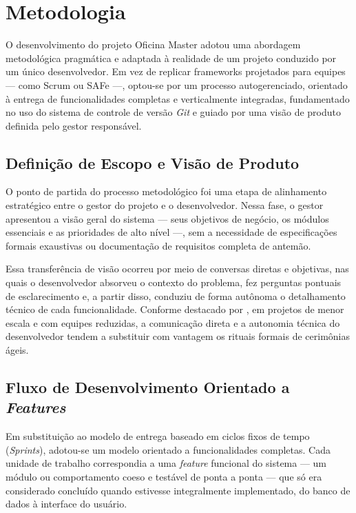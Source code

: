 
\chapter{Metodologia}
\label{cap:metodologia}

O desenvolvimento do projeto Oficina Master adotou uma abordagem metodológica pragmática e adaptada à realidade de um projeto conduzido por um único desenvolvedor. Em vez de replicar frameworks projetados para equipes — como Scrum ou SAFe —, optou-se por um processo autogerenciado, orientado à entrega de funcionalidades completas e verticalmente integradas, fundamentado no uso do sistema de controle de versão \textit{Git} e guiado por uma visão de produto definida pelo gestor responsável.

\section{Definição de Escopo e Visão de Produto}

O ponto de partida do processo metodológico foi uma etapa de alinhamento estratégico entre o gestor do projeto e o desenvolvedor. Nessa fase, o gestor apresentou a visão geral do sistema — seus objetivos de negócio, os módulos essenciais e as prioridades de alto nível —, sem a necessidade de especificações formais exaustivas ou documentação de requisitos completa de antemão.

Essa transferência de visão ocorreu por meio de conversas diretas e objetivas, nas quais o desenvolvedor absorveu o contexto do problema, fez perguntas pontuais de esclarecimento e, a partir disso, conduziu de forma autônoma o detalhamento técnico de cada funcionalidade. Conforme destacado por , em projetos de menor escala e com equipes reduzidas, a comunicação direta e a autonomia técnica do desenvolvedor tendem a substituir com vantagem os rituais formais de cerimônias ágeis.

\section{Fluxo de Desenvolvimento Orientado a \textit{Features}}

Em substituição ao modelo de entrega baseado em ciclos fixos de tempo (\textit{Sprints}), adotou-se um modelo orientado a funcionalidades completas. Cada unidade de trabalho correspondia a uma \textit{feature} funcional do sistema — um módulo ou comportamento coeso e testável de ponta a ponta — que só era considerado concluído quando estivesse integralmente implementado, do banco de dados à interface do usuário.

